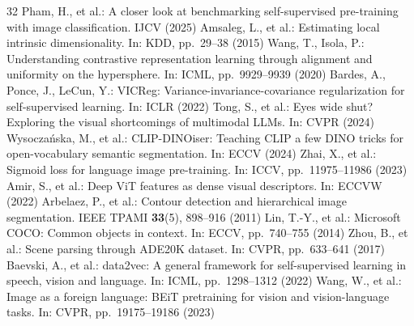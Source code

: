 \documentclass[runningheads]{llncs}
\begin{document}
\begin{sloppypar}
\begin{thebibliography}{32}
Pham, H., et al.: A closer look at benchmarking self-supervised pre-training with image classification. IJCV (2025)
Amsaleg, L., et al.: Estimating local intrinsic dimensionality. In: KDD, pp.~29--38 (2015)
Wang, T., Isola, P.: Understanding contrastive representation learning through alignment and uniformity on the hypersphere. In: ICML, pp.~9929--9939 (2020)
Bardes, A., Ponce, J., LeCun, Y.: VICReg: Variance-invariance-covariance regularization for self-supervised learning. In: ICLR (2022)
Tong, S., et al.: Eyes wide shut? Exploring the visual shortcomings of multimodal LLMs. In: CVPR (2024)
Wysocza\'{n}ska, M., et al.: CLIP-DINOiser: Teaching CLIP a few DINO tricks for open-vocabulary semantic segmentation. In: ECCV (2024)
Zhai, X., et al.: Sigmoid loss for language image pre-training. In: ICCV, pp.~11975--11986 (2023)
Amir, S., et al.: Deep ViT features as dense visual descriptors. In: ECCVW (2022)
Arbelaez, P., et al.: Contour detection and hierarchical image segmentation. IEEE TPAMI \textbf{33}(5), 898--916 (2011)
Lin, T.-Y., et al.: Microsoft COCO: Common objects in context. In: ECCV, pp.~740--755 (2014)
Zhou, B., et al.: Scene parsing through ADE20K dataset. In: CVPR, pp.~633--641 (2017)
Baevski, A., et al.: data2vec: A general framework for self-supervised learning in speech, vision and language. In: ICML, pp.~1298--1312 (2022)
Wang, W., et al.: Image as a foreign language: BEiT pretraining for vision and vision-language tasks. In: CVPR, pp.~19175--19186 (2023)
\end{thebibliography}
\end{sloppypar}
\end{document}
